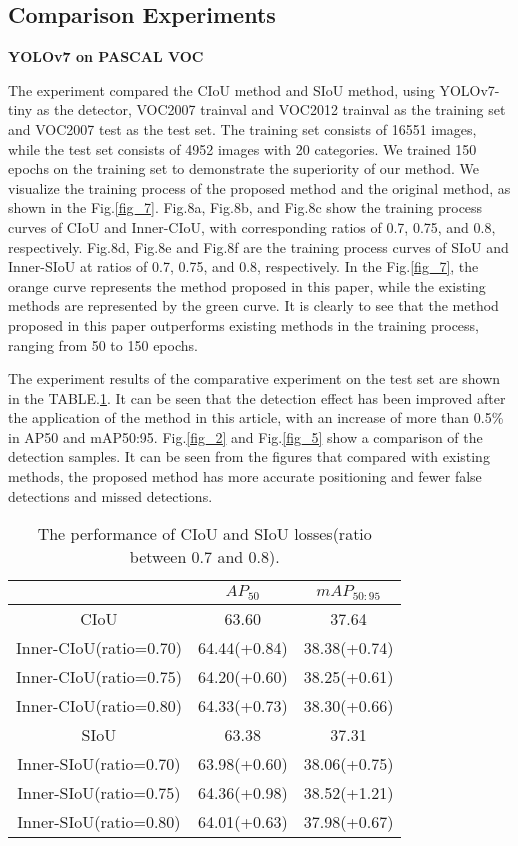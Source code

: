 \documentclass[lettersize,journal]{IEEEtran}
\begin{document}
	\subsection{Comparison Experiments}
	\par \textbf {YOLOv7 on PASCAL VOC}
	\par The experiment compared the CIoU\cite{ref3} method and SIoU\cite{ref5} method, using YOLOv7-tiny\cite{ref13} as the detector, VOC2007 trainval  and VOC2012 trainval as the training set and VOC2007 test as the test set\cite{ref20}. The training set consists of 16551 images, while the test set consists of 4952 images with 20 categories. We trained 150 epochs on the training set to demonstrate the superiority of our method. We visualize the training process of the proposed method and the original method, as shown in the Fig.\ref{fig_7}. Fig.8a, Fig.8b, and Fig.8c show the training process curves of CIoU and Inner-CIoU, with corresponding ratios of 0.7, 0.75, and 0.8, respectively. Fig.8d, Fig.8e and Fig.8f are the training process curves of SIoU and Inner-SIoU at ratios of 0.7, 0.75, and 0.8, respectively. In the Fig.\ref{fig_7}, the orange curve represents the method proposed in this paper, while the existing methods are represented by the green curve. It is clearly to see that the method proposed in this paper outperforms existing methods in the training process, ranging from 50 to 150 epochs.
	\par The experiment results of the comparative experiment on the test set are shown in the TABLE.\ref{tab:mytable1}. It can be seen that the detection effect has been improved after the application of the method in this article, with an increase of more than 0.5\% in AP50 and mAP50:95. Fig.\ref{fig_2} and Fig.\ref{fig_5} show a comparison of the detection samples. It can be seen from the figures that compared with existing methods, the proposed method has more accurate positioning and fewer false detections and missed detections.
	\newline
	\begin{table}[h]
		\centering
		\begin{tabular}{ccc}
			\toprule & $AP_{50}$ & $mAP_{50:95}$ \\
			\midrule CIoU & 63.60 & 37.64 \\
			Inner-CIoU(ratio=0.70) & 64.44(+0.84) & 38.38(+0.74) \\
			Inner-CIoU(ratio=0.75) & 64.20(+0.60) & 38.25(+0.61) \\
			Inner-CIoU(ratio=0.80) & 64.33(+0.73) & 38.30(+0.66) \\
			\midrule SIoU & 63.38 & 37.31 \\
			Inner-SIoU(ratio=0.70) & 63.98(+0.60) & 38.06(+0.75) \\
			Inner-SIoU(ratio=0.75) & 64.36(+0.98) & 38.52(+1.21) \\
			Inner-SIoU(ratio=0.80) & 64.01(+0.63) & 37.98(+0.67) \\
			\bottomrule \end{tabular}
		\caption{The performance of CIoU and SIoU losses(ratio between 0.7 and 0.8).}
		\label{tab:mytable1}
	\end{table}
\end{document}
